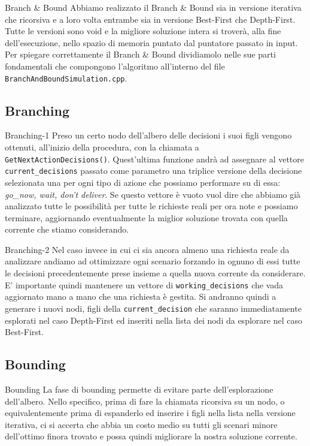 \documentclass[10pt]{beamer}
\begin{document}
    \begin{frame}{Branch \& Bound}
        Abbiamo realizzato il Branch \& Bound sia in versione iterativa che ricorsiva e a loro volta entrambe sia in versione Best-First che Depth-First. Tutte le versioni sono void e la migliore soluzione intera si troverà, alla fine dell'esecuzione, nello spazio di memoria puntato dal puntatore passato in input. Per spiegare correttamente il Branch \& Bound dividiamolo nelle sue parti fondamentali che compongono l'algoritmo all'interno del file \texttt{BranchAndBoundSimulation.cpp}.
    \end{frame}

    \subsection{Branching}\label{sec:branching}
    \begin{frame}{Branching-1}
        Preso un certo nodo dell'albero delle decisioni i suoi figli vengono ottenuti, all'inizio della procedura, con la chiamata a \texttt{GetNextActionDecisions()}. Quest'ultima funzione andrà ad assegnare al vettore \texttt{current\_decisions} passato come parametro una triplice versione della decisione selezionata una per ogni tipo di azione che possiamo performare su di essa: \textit{go\_now, wait, don't deliver}. Se questo vettore è vuoto vuol dire che abbiamo già analizzato tutte le possibilità per tutte le richieste reali per ora note e possiamo terminare, aggiornando eventualmente la miglior soluzione trovata con quella corrente che stiamo considerando.
    \end{frame}

    \begin{frame}{Branching-2}
        Nel caso invece in cui ci sia ancora almeno una richiesta reale da analizzare andiamo ad ottimizzare ogni scenario forzando in ognuno di essi tutte le decisioni precedentemente prese insieme a quella nuova corrente da considerare. E' importante quindi mantenere un vettore di \texttt{working\_decisions} che vada aggiornato mano a mano che una richiesta è gestita. Si andranno quindi a generare i nuovi nodi, figli della \texttt{current\_decision} che saranno immediatamente esplorati nel caso Depth-First ed inseriti nella lista dei nodi da esplorare nel caso Best-First. 
    \end{frame}

    \subsection{Bounding}\label{sec:bounding}
    \begin{frame}{Bounding}
       La fase di bounding permette di evitare parte dell'esplorazione dell'albero. Nello specifico, prima di fare la chiamata ricorsiva su un nodo, o equivalentemente prima di espanderlo ed inserire i figli nella lista nella versione iterativa, ci si accerta che abbia un costo medio su tutti gli scenari minore dell'ottimo finora trovato e possa quindi migliorare la nostra soluzione corrente.
    \end{frame}
\end{document}
